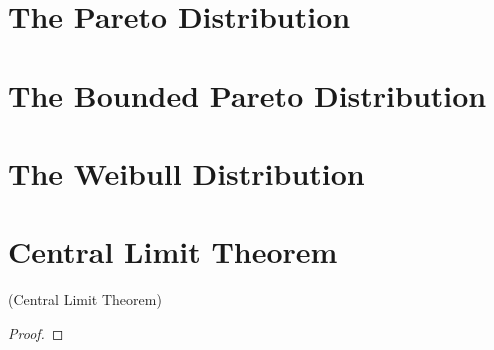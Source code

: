         \begin{theorem}[Memorylessness]
        \end{theorem}
    \section{The Pareto Distribution}
    \section{The Bounded Pareto Distribution}
    \section{The Weibull Distribution}
    \section{Central Limit Theorem}
        \begin{theorem}(Central Limit Theorem)
        \end{theorem}
        \begin{proof}
        \end{proof}

